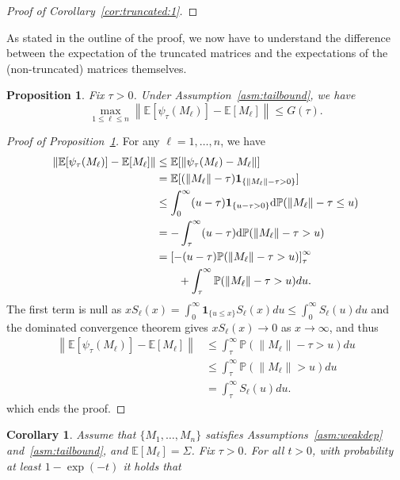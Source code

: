 \documentclass[11pt,a4paper]{article}
\newtheorem{proposition}[theorem]{Proposition}
\newtheorem{corollary}[theorem]{Corollary}
\theoremstyle{remark}
\theoremstyle{definition}
\theoremstyle{definition}
\newcommand{\Surv}{S}
\newcommand{\rc}{\color{black}}
\begin{document}
\begin{bibunit}[apalike]
\begin{proof}[Proof of Corollary~\ref{cor:truncated:1}]
\end{proof}
As stated in the outline of the proof, we now have to understand the difference between the expectation of the truncated matrices and the expectations of the (non-truncated) matrices themselves.
\begin{proposition}
\label{prop:trunc:exp}
Fix $\tau > 0$.
Under Assumption~\ref{asm:tailbound}, we have
$$ \max_{1 \leq \ell \leq n}\left\| \mathbb{E}[\psi_\tau(M_\ell)] - \mathbb{E}[M_\ell] \right\| \leq G(\tau). $$
\end{proposition}
\begin{proof}[Proof of Proposition~\ref{prop:trunc:exp}]
For any $\ell = 1,\ldots,n$, we have
\begin{align*}
    \left\| \mathbb{E}[\psi_\tau(M_\ell)] - \mathbb{E}[M_\ell] \right\|
    & \leq \mathbb{E} [\left\| \psi_\tau(M_\ell)-M_\ell \right\|]
    \\
    & = \mathbb{E} [(\|M_\ell\|-\tau)\mathbf{1}_{\{\|M_\ell\|-\tau>0\}}]
    \\
    & \leq \int_{0}^{\infty} (u-\tau) \mathbf{1}_{\{u-\tau>0\}} {\rm d} \mathbb{P}(\|M_\ell\|-\tau\leq u)
    \\
    & = - \int_{\tau}^{\infty} (u-\tau) {\rm d} \mathbb{P}(\|M_\ell\|-\tau > u)
    \\
    & = \left[ - (u-\tau) \mathbb{P}(\|M_\ell\|-\tau > u)  \right]_{\tau}^{\infty} 
    \\
    & \quad \quad + \int_{\tau}^{\infty}  \mathbb{P}(\|M_\ell\|-\tau> u) du.
\end{align*}
The first term is null as {\rc $x \Surv_{\ell}(x)=\int_{0}^{\infty}\mathbf{1}_{\{u\le x\}}\Surv_{\ell}(x) du\le \int_{0}^{\infty}\Surv_{\ell}(u)du$ and the dominated convergence theorem gives $x \Surv_{\ell}(x)\to0$ as $x\to\infty$}, and thus
\begin{align*}
    \left\| \mathbb{E}[\psi_\tau(M_\ell)] - \mathbb{E}[M_\ell] \right\|
    & \leq \int_{\tau}^{\infty}  \mathbb{P}(\|M_\ell\|-\tau> u) du
    \\
    & \leq \int_{\tau}^{\infty}  \mathbb{P}(\|M_\ell\|> u) du
    \\
    & = \int_{\tau}^{\infty} \Surv_{\ell}(u) du .
\end{align*}
which ends the proof.
\end{proof}
\begin{corollary}
\label{cor:trunc:2}
Assume that $\{M_1,\dots,M_n\}$ satisfies Assumptions~\ref{asm:weakdep} and~\ref{asm:tailbound}, and $\mathbb{E}[M_\ell ]=\Sigma$. Fix $\tau>0$. For all $t>0$, with probability at least $1-\exp(-t)$ it holds that

\end{corollary}
\end{bibunit}
\end{document}
